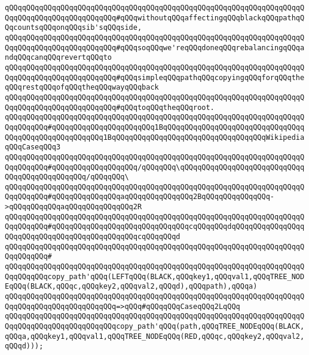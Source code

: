 \verb|qQQqqQQqqQQqqQQqqQQqqQQqqQQqqQQqqQQqqQQqqQQqqQQqqQQqqQQqqQQqqQQqqQQqqQQqqQQqqQQqqQQqqQQqqQQqqQQq#qQQqwithoutqQQqaffectingqQQqblackqQQqpathqQQqcountsqQQqonqQQqsib'sqQQqside,|\newline
\verb|qQQqqQQqqQQqqQQqqQQqqQQqqQQqqQQqqQQqqQQqqQQqqQQqqQQqqQQqqQQqqQQqqQQqqQQqqQQqqQQqqQQqqQQqqQQqqQQq#qQQqsoqQQqwe'reqQQqdoneqQQqrebalancingqQQqandqQQqcanqQQqrevertqQQqto|\newline
\verb|qQQqqQQqqQQqqQQqqQQqqQQqqQQqqQQqqQQqqQQqqQQqqQQqqQQqqQQqqQQqqQQqqQQqqQQqqQQqqQQqqQQqqQQqqQQqqQQq#qQQqsimpleqQQqpathqQQqcopyingqQQqforqQQqtheqQQqrestqQQqofqQQqtheqQQqwayqQQqback|\newline
\verb|qQQqqQQqqQQqqQQqqQQqqQQqqQQqqQQqqQQqqQQqqQQqqQQqqQQqqQQqqQQqqQQqqQQqqQQqqQQqqQQqqQQqqQQqqQQqqQQq#qQQqtoqQQqtheqQQqroot.|\newline
\newline
\verb|qQQqqQQqqQQqqQQqqQQqqQQqqQQqqQQqqQQqqQQqqQQqqQQqqQQqqQQqqQQqqQQqqQQqqQQqqQQqqQQq#qQQqqQQqqQQqqQQqqQQqqQQq1BqQQqqQQqqQQqqQQqqQQqqQQqqQQqqQQqqQQqqQQqqQQqqQQqqQQqqQQq1BqQQqqQQqqQQqqQQqqQQqqQQqqQQqqQQqqQQqWikipediaqQQqCaseqQQq3|\newline
\verb|qQQqqQQqqQQqqQQqqQQqqQQqqQQqqQQqqQQqqQQqqQQqqQQqqQQqqQQqqQQqqQQqqQQqqQQqqQQqqQQq#qQQqqQQqqQQqqQQqqQQq/qQQqqQQq\qQQqqQQqqQQqqQQqqQQqqQQqqQQqqQQqqQQqqQQqqQQqqQQq/qQQqqQQq\|\newline
\verb|qQQqqQQqqQQqqQQqqQQqqQQqqQQqqQQqqQQqqQQqqQQqqQQqqQQqqQQqqQQqqQQqqQQqqQQqqQQqqQQq#qQQqqQQqqQQqqQQqaqQQqqQQqqQQqqQQq2BqQQqqQQqqQQqqQQq->qQQqqQQqqQQqaqQQqqQQqqQQqqQQq2R|\newline
\verb|qQQqqQQqqQQqqQQqqQQqqQQqqQQqqQQqqQQqqQQqqQQqqQQqqQQqqQQqqQQqqQQqqQQqqQQqqQQqqQQq#qQQqqQQqqQQqqQQqqQQqqQQqqQQqqQQqcqQQqqQQqdqQQqqQQqqQQqqQQqqQQqqQQqqQQqqQQqqQQqqQQqqQQqqQQqcqQQqqQQqd|\newline
\verb|qQQqqQQqqQQqqQQqqQQqqQQqqQQqqQQqqQQqqQQqqQQqqQQqqQQqqQQqqQQqqQQqqQQqqQQqqQQqqQQq#|\newline
\verb|qQQqqQQqqQQqqQQqqQQqqQQqqQQqqQQqqQQqqQQqqQQqqQQqqQQqqQQqqQQqqQQqqQQqqQQqqQQqqQQqcopy_path'qQQq(LEFTqQQq(BLACK,qQQqkey1,qQQqval1,qQQqTREE_NODEqQQq(BLACK,qQQqc,qQQqkey2,qQQqval2,qQQqd),qQQqpath),qQQqa)|\newline
\verb|qQQqqQQqqQQqqQQqqQQqqQQqqQQqqQQqqQQqqQQqqQQqqQQqqQQqqQQqqQQqqQQqqQQqqQQqqQQqqQQqqQQqqQQqqQQqqQQq=>qQQq#qQQqqQQqCaseqQQq2LqQQq|\newline
\verb|qQQqqQQqqQQqqQQqqQQqqQQqqQQqqQQqqQQqqQQqqQQqqQQqqQQqqQQqqQQqqQQqqQQqqQQqqQQqqQQqqQQqqQQqqQQqqQQqcopy_path'qQQq(path,qQQqTREE_NODEqQQq(BLACK,qQQqa,qQQqkey1,qQQqval1,qQQqTREE_NODEqQQq(RED,qQQqc,qQQqkey2,qQQqval2,qQQqd)));|\newline
